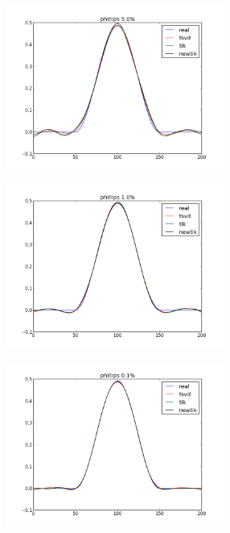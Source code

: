 \documentclass{beamer}
\theoremstyle{plain}
\theoremstyle{definition}
\theoremstyle{remark}
\begin{document}
\begin{frame}
  \begin{figure}
    \centering
    \includegraphics[keepaspectratio,width=270px]{phillips_50.png}
  \end{figure}
\end{frame}

\begin{frame}
  \begin{figure}
    \centering
    \includegraphics[keepaspectratio,width=270px]{phillips_10.png}
  \end{figure}
\end{frame}

\begin{frame}
  \begin{figure}
    \centering
    \includegraphics[keepaspectratio,width=270px]{phillips_1.png}
  \end{figure}
\end{frame}
\end{document}
